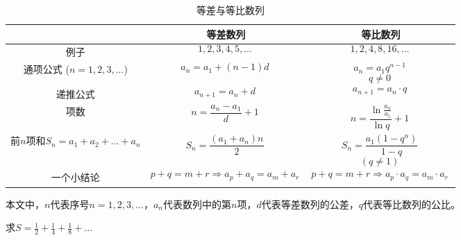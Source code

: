 

\begin{table}[ht]
\centering
\caption{等差与等比数列}\label{tab_AGS1}
\begin{tabular}{|c|c|c|}
\hline
 & 等差数列 & 等比数列 \\
\hline
例子 & $$1,2,3,4,5,...~$$ & $$1,2,4,8,16,...~$$ \\
\hline
通项公式 ($n=1,2,3,...$) & $$a_n = a_1 + (n-1)d~$$ & $$a_n = a_1 q^{n-1}~$$ $$q\ne0~$$ \\
\hline
递推公式 & $$a_{n+1} = a_n + d~$$ & $$a_{n+1} = a_n \cdot q~$$ \\
\hline
项数& $$n = \frac{a_n-a_1}{d} + 1~$$ & $$n = \frac{\ln{\frac{a_n}{a_1}}}{\ln{q}} + 1~$$ \\
\hline
前$n$项和$S_n=a_1+a_2+...+a_n$& $$S_n=\frac{(a_1+a_n)n}{2}~$$ & $$S_n = \frac{a_1 (1-q^n)}{1-q}~$$ $$(q\ne 1)~$$ \\
\hline
一个小结论 & $$p+q=m+r \Rightarrow a_p+a_q = a_m + a_r~$$ & $$p+q=m+r \Rightarrow a_p \cdot a_q = a_m \cdot a_r~$$ \\
\hline
\end{tabular}
\end{table}

本文中，$n$代表序号$n=1,2,3,...$，$a_n$代表数列中的第$n$项，$d$代表等差数列的公差，$q$代表等比数列的公比。

\begin{example}{}
求$S = \frac{1}{2}+\frac{1}{4}+\frac{1}{8}+...$
\end{example}